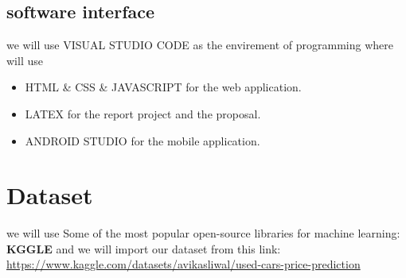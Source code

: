 \documentclass[]{report}   %
\begin{document}
\subsection{software interface}
we will use VISUAL STUDIO CODE as the envirement of programming where will use 
\begin{itemize}
  \item [\ding{228}] HTML \& CSS \& JAVASCRIPT for the web application.\\ 
  \item [\ding{228}]  LATEX for the report project and the proposal.\\
  \item [\ding{228}]  ANDROID STUDIO for the mobile application.\\
\end{itemize}
  \section{Dataset}         %
  we will use Some of the most popular open-source libraries for machine learning:
\textbf{KGGLE} and we will import our dataset from this link: \url{https://www.kaggle.com/datasets/avikasliwal/used-cars-price-prediction}
\end{document}
